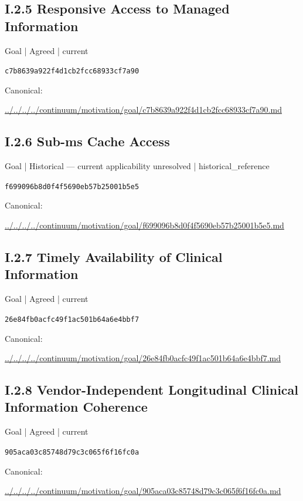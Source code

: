 \documentclass[10pt,a4paper]{article}
\begin{document}
\subsection*{I.2.5 Responsive Access to Managed Information}
\label{element-c7b8639a922f4d1cb2fcc68933cf7a90}
{\small Goal | Agreed | current}\par
\texttt{c7b8639a922f4d1cb2fcc68933cf7a90}\par
Canonical: \par
{\footnotesize\url{../../../../continuum/motivation/goal/c7b8639a922f4d1cb2fcc68933cf7a90.md}}\par
\subsection*{I.2.6 Sub-ms Cache Access}
\label{element-f699096b8d0f4f5690eb57b25001b5e5}
{\small Goal | Historical — current applicability unresolved | historical\_reference}\par
\texttt{f699096b8d0f4f5690eb57b25001b5e5}\par
Canonical: \par
{\footnotesize\url{../../../../continuum/motivation/goal/f699096b8d0f4f5690eb57b25001b5e5.md}}\par
\subsection*{I.2.7 Timely Availability of Clinical Information}
\label{element-26e84fb0acfc49f1ac501b64a6e4bbf7}
{\small Goal | Agreed | current}\par
\texttt{26e84fb0acfc49f1ac501b64a6e4bbf7}\par
Canonical: \par
{\footnotesize\url{../../../../continuum/motivation/goal/26e84fb0acfc49f1ac501b64a6e4bbf7.md}}\par
\subsection*{I.2.8 Vendor-Independent Longitudinal Clinical Information Coherence}
\label{element-905aca03c85748d79c3c065f6f16fc0a}
{\small Goal | Agreed | current}\par
\texttt{905aca03c85748d79c3c065f6f16fc0a}\par
Canonical: \par
{\footnotesize\url{../../../../continuum/motivation/goal/905aca03c85748d79c3c065f6f16fc0a.md}}\par
\end{document}
